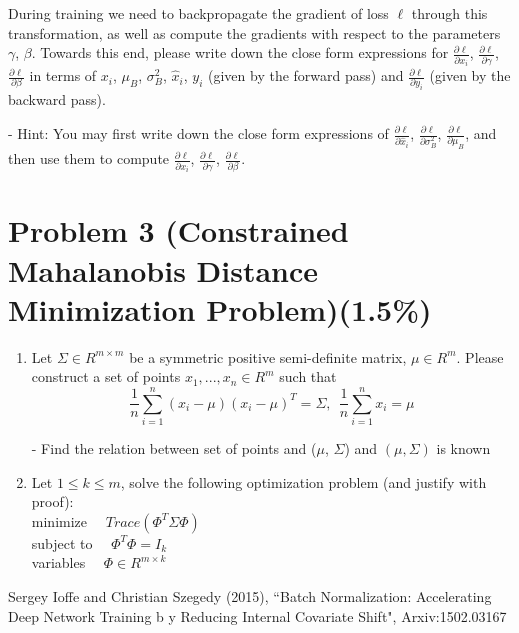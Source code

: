 \documentclass{article}
\begin{document}
During training we need to backpropagate the gradient of loss $\ell$ through this transformation, as well as compute the gradients with respect to the parameters $\gamma$, $\beta$.  Towards this end, please write down the close form expressions for $\frac{\partial \ell}{\partial x_i}$, $\frac{\partial \ell}{\partial \gamma}$, $\frac{\partial \ell}{\partial \beta}$ in terms of $x_i$, $\mu_B$, $\sigma_B^2$, ${\hat x}_i$, $y_i$ (given by the forward pass) and $\frac{\partial \ell}{\partial y_i}$ (given by the backward pass).

- Hint: You may first write down the close form expressions of $\frac{\partial \ell}{\partial {\hat x}_i}$, $\frac{\partial \ell}{\partial \sigma_B^2}$, $\frac{\partial \ell}{\partial \mu_B}$, and then use them to compute $\frac{\partial \ell}{\partial x_i}$, $\frac{\partial \ell}{\partial \gamma}$, $\frac{\partial \ell}{\partial \beta}$.



\section*{Problem 3 (Constrained Mahalanobis Distance Minimization Problem)(1.5\%)}
\begin{enumerate}
    \item Let $\Sigma \in R^{m \times m}$ be a symmetric positive semi-definite matrix, $\mu \in R^m$.  Please construct a set of points $x_1,...,x_n \in R^m$ such that
$$\frac{1}{n}\sum_{i=1}^n (x_i - \mu) (x_i - \mu)^T = \Sigma, ~~ \frac{1}{n}\sum_{i=1}^n x_i = \mu$$

- Find the relation between set of points and ($\mu$, $\Sigma$) and $(\mu, \Sigma)$ is known
\item Let $1 \leq k \leq m$, solve the following optimization problem (and justify with proof): \\
minimize  $\quad Trace(\Phi^T \Sigma \Phi)$ \\ 
subject to $\quad \Phi^T \Phi = I_k$ \\
variables $\quad \Phi \in R^{m \times k}$
\end{enumerate}

\begin{thebibliography}{50}
	 Sergey Ioffe and Christian Szegedy (2015), ``Batch Normalization: Accelerating Deep Network Training b
y Reducing Internal Covariate Shift", Arxiv:1502.03167
\end{thebibliography}
\end{document}
